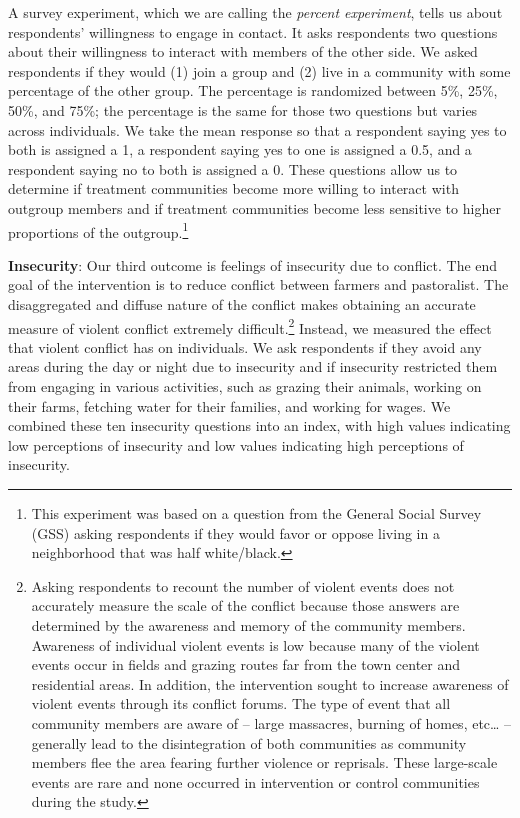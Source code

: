 \documentclass[11pt]{article}
\begin{document}
A survey experiment, which we are calling the \emph{percent experiment},
tells us about respondents' willingness to engage in contact. It asks
respondents two questions about their willingness to interact with
members of the other side. We asked respondents if they would (1) join a
group and (2) live in a community with some percentage of the other
group. The percentage is randomized between 5\%, 25\%, 50\%, and 75\%;
the percentage is the same for those two questions but varies across
individuals. We take the mean response so that a respondent saying yes
to both is assigned a 1, a respondent saying yes to one is assigned a
0.5, and a respondent saying no to both is assigned a 0. These questions
allow us to determine if treatment communities become more willing to
interact with outgroup members and if treatment communities become less
sensitive to higher proportions of the outgroup.\footnote{This
  experiment was based on a question from the General Social Survey
  (GSS) asking respondents if they would favor or oppose living in a
  neighborhood that was half white/black.}

\textbf{Insecurity}: Our third outcome is feelings of insecurity due to
conflict. The end goal of the intervention is to reduce conflict between
farmers and pastoralist. The disaggregated and diffuse nature of the
conflict makes obtaining an accurate measure of violent conflict
extremely difficult.\footnote{Asking respondents to recount the number
  of violent events does not accurately measure the scale of the
  conflict because those answers are determined by the awareness and
  memory of the community members. Awareness of individual violent
  events is low because many of the violent events occur in fields and
  grazing routes far from the town center and residential areas. In
  addition, the intervention sought to increase awareness of violent
  events through its conflict forums. The type of event that all
  community members are aware of -- large massacres, burning of homes,
  etc\ldots{} -- generally lead to the disintegration of both
  communities as community members flee the area fearing further
  violence or reprisals. These large-scale events are rare and none
  occurred in intervention or control communities during the study.}
Instead, we measured the effect that violent conflict has on
individuals. We ask respondents if they avoid any areas during the day
or night due to insecurity and if insecurity restricted them from
engaging in various activities, such as grazing their animals, working
on their farms, fetching water for their families, and working for
wages. We combined these ten insecurity questions into an index, with
high values indicating low perceptions of insecurity and low values
indicating high perceptions of insecurity.
\end{document}
